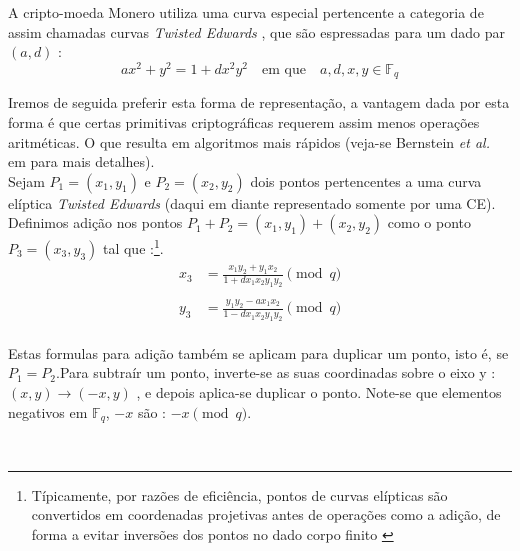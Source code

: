 A cripto-moeda Monero utiliza uma curva especial pertencente a categoria de assim chamadas curvas {\em Twisted Edwards} \cite{Bernstein2008}, que são espressadas para um dado par $(a,d)$ :
\vspace{.175cm}
\[a x^2 + y^2 = 1 + d x^2 y^2 \quad \textrm{em que} \quad a, d, x, y \in \mathbb{F}_q \]

Iremos de seguida preferir esta forma de representação, a vantagem dada por esta forma é que certas primitivas criptográficas requerem assim menos operações aritméticas. O que resulta em algoritmos mais rápidos (veja-se Bernstein {\em et al.} em \cite{Bernstein2007} para mais detalhes).\\

Sejam \(P_1 = (x_1, y_1)\) e \(P_2 = (x_2, y_2)\) dois pontos pertencentes a uma curva elíptica {\em Twisted Edwards} (daqui em diante representado somente por uma CE). Definimos adição nos pontos $P_1 + P_2 = (x_1, y_1) + (x_2, y_2)$ como o ponto $P_3 = (x_3, y_3)$ tal que :\footnote{Típicamente, por razões de eficiência, pontos de curvas elípticas são convertidos em coordenadas projetivas antes de operações como a adição, de forma a evitar inversões dos pontos no dado corpo finito \cite{ecc-projective}}.
\vspace{.375cm}
\begin{align*}
x_3 & =  \frac{x_1 y_2 + y_1 x_ 2}{1 + d x_1 x_2 y_1 y_2}  \pmod{q} \\
\\
y_3 & =  \frac{y_1 y_2 - a x_1 x_2}{1 - d x_1 x_2 y_1 y_2} \pmod{q} 
\end{align*}
\\
Estas formulas para adição também se aplicam para duplicar um ponto, isto é, se \(P_1 = P_2\).\newline Para subtraír um ponto, inverte-se as suas coordinadas sobre o eixo y : $(x,y) \rightarrow (-x,y)$ \cite{Bernstein2008}, e depois aplica-se duplicar o ponto. Note-se que elementos negativos em $\mathbb{F}_q$, $-x$ são : $-x \pmod{q}$.

\\

